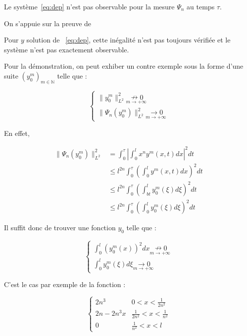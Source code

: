 \documentclass[a4paper]{article}
\begin{document}
\begin{proposition}
	Le système~\eqref{eq:dep} n'est pas observable pour la mesure $\Psi_n$ 
	au temps $\tau$.
\end{proposition}

\begin{preuve}
	On s'appuie sur la preuve de \cite{LBrivadis}
	
Pour $y$ solution de ~\eqref{eq:dep}, cette inégalité n'est pas toujours vérifiée et le système n'est pas exactement observable.

Pour la démonstration, on peut exhiber un contre exemple sous la forme d'une suite $(y_0^m)_{m \in \mathbb{N}}$ telle que :

\[
\begin{cases}
	\|y_0^m\|^2_{L^2} \underset{m\to+\infty}{\nrightarrow 0} \\
	\| \Psi_n (y_0^m)\|_{L^2}^2 \underset{m\to+\infty}{\rightarrow 0}
\end{cases}
\]
	
En effet,

\[ 
\begin{split}
	\| \Psi_n (y_0^m)\|_{L^2}^2  &= \int_0^\tau  |\int_0^l x^n y^m(x,t) dx |^2 dt \\
	                             & \leq l^{2n}  \int_0^\tau (\int_0^l y^m(x,t)dx)^2dt \\
								 & \leq l^{2n} \int_0^\tau (\int_{bt}^l y_0^m(\xi)d\xi)^2dt \\
								 & \leq l^{2n} \int_0^\tau (\int_0^l y_0^m(\xi)d\xi)^2 dt
\end{split}
\]

Il suffit donc de trouver une fonction $y_0$ telle que :

\[
\begin{cases}
	\int_0^l (y_0^m(x))^2 dx \underset{m\to+\infty}{\nrightarrow 0} \\
	\int_0^l y_0^m(\xi)d\xi \underset{m\to+\infty}{\rightarrow 0}
\end{cases}
\]

C'est le cas par exemple de la fonction :

\[
\begin{cases}
	2n^3 & 0 <x < \frac{1}{2n^2}\\
	2n - 2n^3x & \frac{1}{2n^2} <x<\frac{1}{n^2}\\
	0 & \frac{1}{n^2} <x<l
\end{cases}
\]

\end{preuve}
\end{document}
